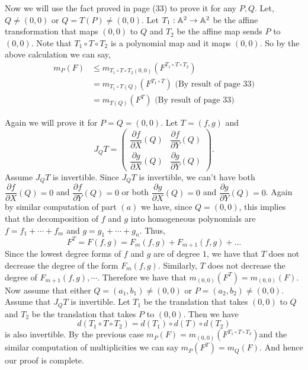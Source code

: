 \documentclass[12pt]{article}
\begin{document}
\vspace*{0.2cm}

 Now we will use the fact proved in page (33) to prove it for any $P,Q$. Let, $Q\neq (0,0)$ or $Q = T(P)\neq (0,0)$. Let $T_1 : \mathbb{A}^2 \to \mathbb{A}^2$ be the affine transformation that maps $(0,0)$ to $Q$ and $T_2$ be the affine map sends $P$ to $(0,0)$. Note that $T_1  \circ T \circ T_2$ is a polynomial map and it maps $(0,0)$. So by the above calculation we can say, \begin{align*}
    m_P(F) &\leq m_{T_1  \circ T \circ T_2(0,0)}(F^{T_1  \circ T \circ T_2}) \\
    &= m_{T_1  \circ T (Q)}(F^{T_1  \circ T }) \text{ (By result of page 33})\\
    &= m_{T (Q)}(F^{T }) \text{ (By result of page 33})
 \end{align*}

 \vspace*{0.2cm}

 \noindent {} Again we will prove it for $P=Q=(0,0)$. Let $T = (f,g)$ and 
 $$
 J_Q T = \begin{pmatrix} \dfrac{\partial f}{\partial X}(Q) & \dfrac{\partial f}{\partial Y}(Q) \\ \dfrac{\partial g}{\partial X}(Q) & \dfrac{\partial g}{\partial Y}(Q) \end{pmatrix}.
 $$
 Assume $J_Q T$ is invertible. Since $J_Q T$ is invertible, we can't have both $\dfrac{\partial f}{\partial X}(Q) = 0$ and $\dfrac{\partial f}{\partial Y}(Q) = 0$ or both $\dfrac{\partial g}{\partial X}(Q) = 0$ and $\dfrac{\partial g}{\partial Y}(Q) = 0$. Again by similar computation of part $(a)$ we have, since $Q = (0,0)$, this implies that the decomposition of $f$ and $g$ into homogeneous polynomials are $f = f_1 + \cdots + f_m$ 
and $g = g_1 + \cdots + g_n$. Thus,
 $$
 F^T = F(f,g) = F_m(f,g) + F_{m+1}(f,g) + \ldots
 $$
 Since the lowest degree forms of $f$ and $g$ are of degree $1$, we have that $T$ does not decrease the degree of the form $F_m(f,g)$. Similarly, $T$ does not decrease the degree of $F_{m+1}(f,g), \cdots$. Therefore we have that $m_{(0,0)}(F^T) = m_{(0,0)}(F)$. Now assume that either $Q = (a_1,b_1) \neq (0,0)$ or $P = (a_2,b_2) \neq (0,0)$. Assume that $J_Q T$ is invertible. Let $T_1$  be the translation that takes $(0,0)$ to $Q$ and $T_2$ be the translation that takes $P$ to $(0,0)$. Then we have
 $$
  d(T_1\circ T\circ T_2) = d(T_1)\circ d(T) \circ d(T_2)
 $$
is also invertible. By the previous case $m_P(F) = m_{(0,0)}(F^{T_1\circ T\circ T_2})$and the similar computation of multiplicities we can say $m_P(F^T)=m_Q(F)$. And hence our proof is complete. 
\end{document}
